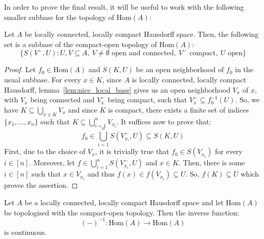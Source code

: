 In order to prove the final result, it will be useful to work with the following smaller subbase for the topology of $\mathrm{Hom}(A)$:
\begin{lemma}\label{lem:alt_subbasis} Let $A$ be locally connected, locally compact Hausdorff space. Then, the following set is a subbase of the compact-open topology of $\mathrm{Hom}(A)$:
\[\big\{S(V^-,U):U,V\subseteq A,\ V\neq\emptyset\text{ open and connected},\ V^-\text{ compact},\ U\text{ open}\big\}\]
\end{lemma}
\begin{proof} Let $f_0\in\mathrm{Hom}(A)$ and $S(K,U)$ be an open neighborhood of $f_0$ in the usual subbase. For every $x\in K$, since $A$ is locally connected, locally compact Hausdorff, lemma~\ref{lem:nice_local_base} gives us an open neighborhood $V_x$ of $x$, with $V_x$ being connected and $V_x^-$ being compact, such that $V_x^-\subseteq f_0^{-1}(U)$. So, we have $K\subseteq\bigcup_{x\in K}V_x$ and since $K$ is compact, there exists a finite set of indices $\{x_1,\ldots,x_n\}$ such that $K\subseteq\bigcup_{i=1}^nV_{x_i}$. It suffices now to prove that:
\[f_0\in\bigcup_{i=1}^nS(V_{x_i}^-,U)\subseteq S(K,U)\]
First, due to the choice of $V_x$, it is trivially true that $f_0\in S(V_{x_i})$ for every $i\in[n]$. Moreover, let $f\in\bigcup_{i=1}^nS(V_{x_i}^-,U)$ and $x\in K$. Then, there is some $i\in[n]$ such that $x\in V_{x_i}$ and thus $f(x)\in f(V_{x_i})\subseteq U$. So, $f(K)\subseteq U$ which proves the assertion.
\end{proof}
\begin{theorem}\label{thm:inverse} Let $A$ be a locally connected, locally compact Hausdorff space and let $\mathrm{Hom}(A)$ be topologised with the compact-open topology. Then the inverse function:
\[(-)^{-1}:\mathrm{Hom}(A)\to\mathrm{Hom}(A)\]
is continuous.
\end{theorem}
